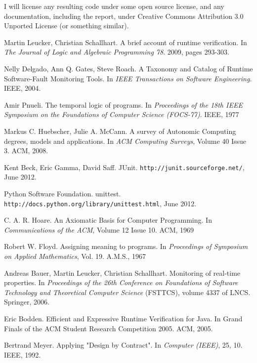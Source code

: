 \documentclass[a4paper,11pt]{article}
\begin{document}
I will license any resulting code under some open source license, and any documentation, including the report, under Creative Commons Attribution 3.0 Unported License \cite{cc-by} (or something similar).


\begin{thebibliography}{9}

	Martin Leucker, Christian Schallhart.
	A brief account of runtime verification.
	In \emph{The Journal of Logic and Algebraic Programming 78}.
	2009, pages 293-303.

	Nelly Delgado, Ann Q. Gates, Steve Roach.
	A Taxonomy and Catalog of Runtime Software-Fault Monitoring Tools.
	In \emph{IEEE Transactions on Software Engineering}.
	IEEE, 2004.

	Amir Pnueli.
	The temporal logic of programs. 
	In \emph{Proceedings of the 18th IEEE Symposium on the Foundations of Computer Science (FOCS-77)}.
	IEEE, 1977

	Markus C. Huebscher, Julie A. McCann.
	A survey of Autonomic Computing \- degrees, models and applications.
	In \emph{ACM Computing Surveys}, Volume 40 Issue 3.
	ACM, 2008.
	
	Kent Beck, Eric Gamma, David Saff.
	JUnit.
	\texttt{http://junit.sourceforge.net/},
	June 2012.

	Python Software Foundation.
	unittest.
	\texttt{http://docs.python.org/library/unittest.html},
	June 2012.

	C. A. R. Hoare.
	An Axiomatic Basis for Computer Programming.
	In \emph{Communications of the ACM}, Volume 12 Issue 10.
	ACM, 1969

	Robert W. Floyd.
	Assigning meaning to programs.
	In \emph{Proceedings of Symposium on Applied Mathematics}, Vol. 19.
	A.M.S., 1967

	Andreas Bauer, Martin Leucker, Christian Schallhart.
	Monitoring of real-time properties.
	In \emph{Proceedings of the 26th Conference on Foundations of Software Technology and Theoretical Computer Science} (FSTTCS), volume 4337 of LNCS.
	Springer, 2006.

	Eric Bodden.
	Efficient and Expressive Runtime Verification for Java.
	In Grand Finals of the ACM Student Research Competition 2005.
	ACM, 2005.

	Bertrand Meyer.
	Applying "Design by Contract".
	In \emph{Computer (IEEE)}, 25, 10.
	IEEE, 1992.
	

\end{thebibliography}
\end{document}
